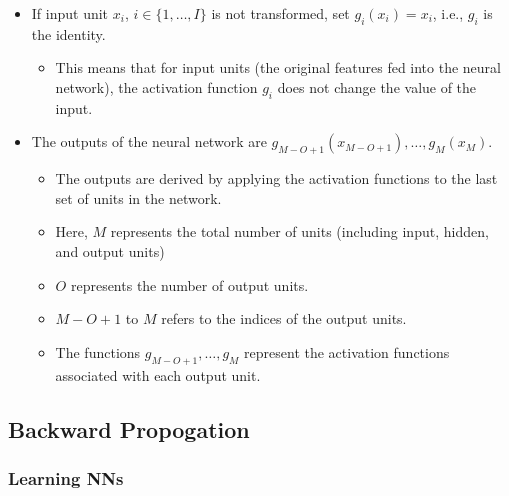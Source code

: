\begin{definition}
    \begin{itemize}
        \item If input unit $x_i$, $i \in \{1, \ldots, I\}$ is not transformed, set $g_i(x_i) = x_i$, i.e., $g_i$ is the identity.
        \begin{itemize}
            \item This means that for input units (the original features fed into the neural network), the activation function $g_i$ does not change the value of the input. 
        \end{itemize}
        \item The outputs of the neural network are $g_{M-O+1}(x_{M-O+1}), \ldots, g_M(x_M)$.
        \begin{itemize}
            \item The outputs are derived by applying the activation functions to the last set of units in the network.
            \item Here, $M$ represents the total number of units (including input, hidden, and output units)
            \item $O$ represents the number of output units. 
            \item $M-O+1$ to $M$ refers to the indices of the output units.
            \item The functions $g_{M-O+1}, \ldots, g_M$ represent the activation functions associated with each output unit. 
        \end{itemize}
    \end{itemize}    
\end{definition}

\begin{example}
\end{example}

\subsection{Backward Propogation}
\subsubsection{Learning NNs}
\begin{example}
\end{example}

